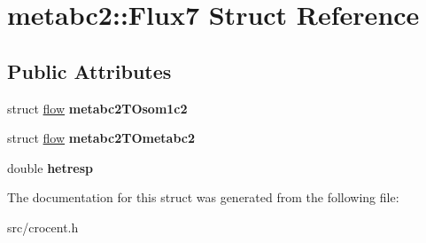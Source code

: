 \hypertarget{structmetabc2_1_1_flux7}{\section{metabc2\-:\-:Flux7 Struct Reference}
\label{structmetabc2_1_1_flux7}
}
\subsection*{Public Attributes}
\begin{DoxyCompactItemize}
\item 
\hypertarget{structmetabc2_1_1_flux7_a395fc6f09ee2993ccd470ebf1d09f8b2}{struct \hyperlink{structflow}{flow} {\bfseries metabc2\-T\-Osom1c2}}\label{structmetabc2_1_1_flux7_a395fc6f09ee2993ccd470ebf1d09f8b2}

\item 
\hypertarget{structmetabc2_1_1_flux7_ae93ef50c208f55439b5453474cd00614}{struct \hyperlink{structflow}{flow} {\bfseries metabc2\-T\-Ometabc2}}\label{structmetabc2_1_1_flux7_ae93ef50c208f55439b5453474cd00614}

\item 
\hypertarget{structmetabc2_1_1_flux7_a402a1766137c67579f7fa7854435e2d3}{double {\bfseries hetresp}}\label{structmetabc2_1_1_flux7_a402a1766137c67579f7fa7854435e2d3}

\end{DoxyCompactItemize}


The documentation for this struct was generated from the following file\-:\begin{DoxyCompactItemize}
\item 
src/crocent.\-h\end{DoxyCompactItemize}

